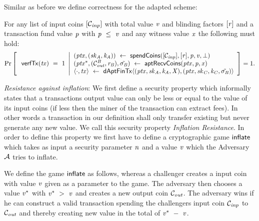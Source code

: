 Similar as before we define correctness for the adapted scheme:

\begin{definition}
    \label{def:apt-tx-scheme-correctness}
    For any list of input coins $[\mathcal{C}_{\mathit{inp}}]$ with total value $\mathit{v}$ and blinding factors
    $[\mathit{r}]$ and a transaction fund value $\mathit{p}$ with $\mathit{p} ~\leq~ \mathit{v}$ and any witness value $\mathit{x}$ the following must hold:
    \[
        \Pr\left[
        \begin{array}{c}
            \: \mathsf{verfTx}(\mathit{tx}) ~=~ 1
        \end{array}
        \middle\vert
        \begin{array}{l}
            (\mathit{ptx}, (\mathit{sk}_{\mathit{A}}, \mathit{\mathit{k}_{\mathit{A}}})) ~\leftarrow~ \mathsf{spendCoins}([\mathcal{C}_{\mathit{inp}}],[\mathit{r}],\mathit{p},\mathit{v},\bot) \\
            (\mathit{ptx}^*, (\mathcal{C}_{\mathit{out}}^{\mathit{B}},\mathit{r}_{\mathit{B}}), \tilde{\sigma_{\mathit{B}}}) ~\leftarrow~ \mathsf{aptRecvCoins}(\mathit{ptx},\mathit{p},\mathit{x}) \\
            \langle \cdot, \mathit{tx} \rangle ~\leftarrow~ \mathsf{dAptFinTx} \langle (\mathit{ptx},\mathit{sk}_{\mathit{A}},\mathit{\mathit{k}_{\mathit{A}}},\mathit{X}), (\mathit{ptx},\mathit{sk}_{\mathit{C}},\mathit{\mathit{k}_{\mathit{C}}},\tilde{\sigma_{\mathit{B}}}) \rangle
        \end{array}
        \right]=1.
    \]
\end{definition}

\emph{Resistance against inflation}: We first define a security property which informally states that a transactions output value can only be less or equal to the value of its input coins (if less then the miner of the transaction can extract fees).
In other words a transaction in our definition shall only transfer existing but never generate any new value. We call this security property \emph{Inflation Resistance}.
In order to define this property we first have to define a cryptographic game $\mathsf{inflate}$ which takes as input a security parameter $\mathit{n}$ and a value $\mathit{v}$ which the Adversary
$\mathcal{A}$ tries to inflate.

We define the game $\mathsf{inflate}$ as follows, whereas a challenger creates a input coin with value $\mathit{v}$ given as a parameter to the game. The adversary then chooses a value $\mathit{v}^*$ with
$\mathit{v}^* ~>~ \mathit{v}$ and creates a new output coin $\mathcal{C}_{\mathit{out}}$. The adversary wins if he can construct a valid transaction spending the challengers input coin $\mathcal{C}_{\mathit{inp}}$ to $\mathcal{C}_{\mathit{out}}$ and thereby
creating new value in the total of $\mathit{v}^* ~-~ \mathit{v}$.

